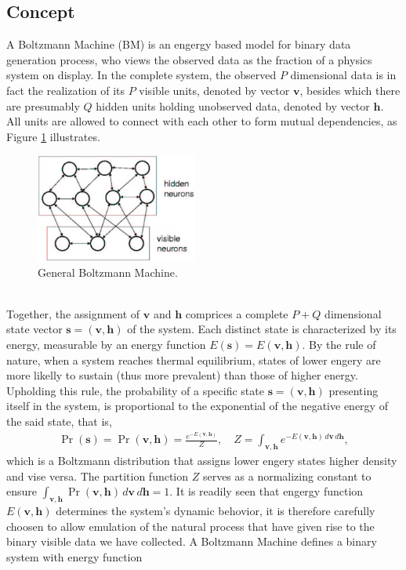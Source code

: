 \documentclass[11pt]{article}
\newcommand{\vh}{\boldsymbol{h}}
\newcommand{\vv}{\boldsymbol{v}}
\newcommand{\vs}{\boldsymbol{s}}
\begin{document}
\subsection{Concept}
A Boltzmann Machine (BM) is an engergy based model for binary data generation process, who views the observed data as the fraction of a physics system on display. In the complete system, the observed $P$ dimensional data is in fact the realization of its $P$ visible units, denoted by vector $\vv$, besides which there are presumably $Q$ hidden units holding unobserved data, denoted by vector $\vh$. All units are allowed to connect with each other to form mutual dependencies, as Figure \ref{fig:gbm} illustrates.
\begin{figure}[h]
  \centering
  \includegraphics[width=200px]{img/gbm.png}
  \caption{General Boltzmann Machine.}\label{fig:gbm}
\end{figure} \\
Together, the assignment of $\vv$ and $\vh$ comprices a complete $P+Q$ dimensional state vector $\vs =(\vv, \vh)$ of the system. Each distinct state is characterized by its energy, measurable by an energy function $E(\vs) = E(\vv, \vh)$. By the rule of nature, when a system reaches thermal equilibrium, states of lower engery are more likelly to sustain (thus more prevalent) than those of higher energy. Upholding this rule, the probability of a specific state $\vs=(\vv, \vh)$ presenting itself in the system, is proportional to the exponential of the negative energy of the said state, that is,
\begin{equation} \label{eq:p(s)}  %
  \begin{split}
    \Pr(\vs) = \Pr(\vv, \vh) = \frac{e^{-E(\vv, \vh)}}{Z}, \quad Z = \int_{\vv,\vh} e^{-E(\vv, \vh) \,d\vv\,d\vh},
  \end{split}
\end{equation}
which is a Boltzmann distribution that assigns lower engery states higher density and vise versa. The partition function $Z$ serves as a normalizing constant to ensure $\int_{\vv, \vh} \Pr(\vv, \vh) \,d\vv\,d\vh = 1$. It is readily seen that engergy function $E(\vv, \vh)$ determines the system's dynamic behovior, it is therefore carefully choosen to allow emulation of the natural process that have given rise to the binary visible data we have collected. A Boltzmann Machine defines a binary system with energy function
\end{document}
